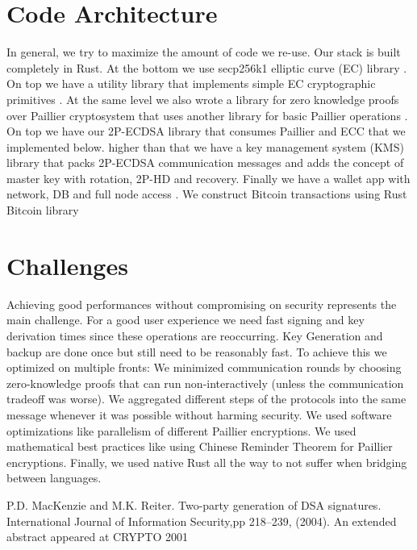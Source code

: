 \documentclass[runningheads]{llncs}
\begin{document}
{{\section{Code Architecture}
In general, we try to maximize the amount of code we re-use. Our stack is built completely in Rust. At the bottom we use secp256k1 elliptic curve (EC) library \cite{secp}. On top we have a utility library that implements simple EC cryptographic primitives \cite{curv}. At the same level we also wrote a library for zero knowledge proofs over Paillier cryptosystem \cite{zk-paillier} that uses another library for basic Paillier operations \cite{paillier}. On top we have our 2P-ECDSA library \cite{ecdsa} that consumes Paillier and ECC that we implemented below. higher than that we have a key management system (KMS) library \cite{kms} that packs 2P-ECDSA communication messages and adds the concept of master key with rotation, 2P-HD and recovery. Finally we have a wallet app with network, DB and full node access \cite{newyork}. We construct Bitcoin transactions using Rust Bitcoin library \cite{rust-bitcoin}

\section{Challenges}
Achieving good performances without compromising on security represents the main challenge. For a good user experience we need fast signing and key derivation times since these operations are reoccurring. Key Generation and backup are done once but still need to be reasonably fast. To achieve this we optimized on multiple fronts:  We minimized communication rounds by choosing zero-knowledge proofs that can run non-interactively (unless the communication tradeoff was worse). We aggregated different steps of the protocols into the same message whenever it was possible without harming security. We used software optimizations like parallelism of different Paillier encryptions. We used mathematical best practices like using Chinese Reminder Theorem for Paillier encryptions. Finally, we used native Rust all the way to not suffer when bridging between languages. 

\begin{thebibliography}{8}
P.D. MacKenzie and M.K. Reiter. Two-party generation of DSA signatures. International
Journal of Information Security,pp 218–239, (2004). An extended
abstract appeared at CRYPTO 2001


\end{thebibliography}}}
\end{document}
